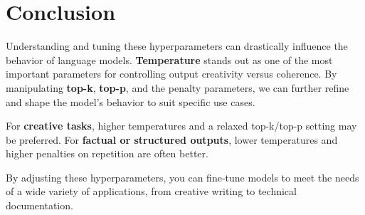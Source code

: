 \documentclass{article}
\begin{document}
\section*{Conclusion}

Understanding and tuning these hyperparameters can drastically influence the behavior of language models. \textbf{Temperature} stands out as one of the most important parameters for controlling output creativity versus coherence. By manipulating \textbf{top-k}, \textbf{top-p}, and the penalty parameters, we can further refine and shape the model's behavior to suit specific use cases.

For \textbf{creative tasks}, higher temperatures and a relaxed top-k/top-p setting may be preferred. For \textbf{factual or structured outputs}, lower temperatures and higher penalties on repetition are often better.

By adjusting these hyperparameters, you can fine-tune models to meet the needs of a wide variety of applications, from creative writing to technical documentation.
\end{document}
